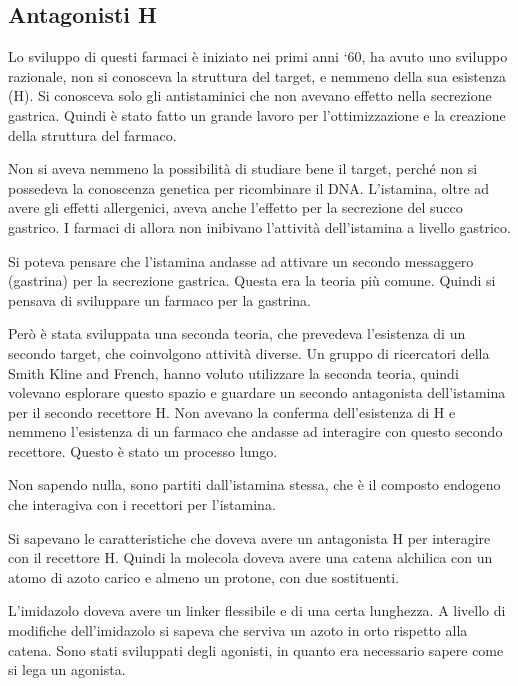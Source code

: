 \subsection{\texorpdfstring{Antagonisti H}{Antagonisti H2}}

Lo sviluppo di questi farmaci è iniziato nei primi anni `60, ha avuto uno sviluppo razionale,
non si conosceva la struttura del target, e nemmeno della sua esistenza
(H).
Si conosceva solo gli antistaminici che non avevano effetto nella
secrezione gastrica.
Quindi è stato fatto un grande lavoro per l'ottimizzazione e la
creazione della struttura del farmaco.

Non si aveva nemmeno la possibilità di studiare bene il target, perché
non si possedeva la conoscenza genetica per ricombinare il DNA.
L'istamina, oltre ad avere gli effetti allergenici, aveva anche
l'effetto per la secrezione del succo gastrico.
I farmaci di allora non inibivano l'attività dell'istamina a livello
gastrico.

Si poteva pensare che l'istamina andasse ad attivare un secondo
messaggero (gastrina) per la secrezione gastrica. Questa era la teoria
più comune. Quindi si pensava di sviluppare un farmaco per la gastrina.

Però è stata sviluppata una seconda teoria, che prevedeva l'esistenza di
un secondo target, che coinvolgono attività diverse. Un gruppo di
ricercatori della Smith Kline and French, hanno voluto utilizzare la
seconda teoria, quindi volevano esplorare questo spazio e guardare un
secondo antagonista dell'istamina per il secondo recettore H.
Non avevano la conferma dell'esistenza di H e nemmeno l'esistenza di un
farmaco che andasse ad interagire con questo secondo recettore. Questo è
stato un processo lungo.

Non sapendo nulla, sono partiti dall'istamina stessa, che è il composto
endogeno che interagiva con i recettori per l'istamina.

Si sapevano le caratteristiche che doveva avere un antagonista H per
interagire con il recettore H. Quindi la molecola doveva avere una
catena alchilica con un atomo di azoto carico e almeno un protone, con
due sostituenti.

L'imidazolo doveva avere un linker flessibile e di una certa lunghezza.
A livello di modifiche dell'imidazolo si sapeva che serviva un azoto in
orto rispetto alla catena.
Sono stati sviluppati degli agonisti, in quanto era necessario sapere
come si lega un agonista.

